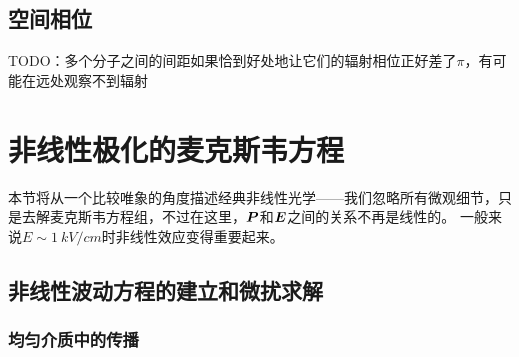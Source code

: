 \subsection{空间相位}

TODO：多个分子之间的间距如果恰到好处地让它们的辐射相位正好差了$\pi$，有可能在远处观察不到辐射

\section{非线性极化的麦克斯韦方程}\label{sec:non-linear-maxwell}

本节将从一个比较唯象的角度描述经典非线性光学——我们忽略所有微观细节，只是去解麦克斯韦方程组，不过在这里，$\vb*{P}$和$\vb*{E}$之间的关系不再是线性的。
一般来说$E \sim \SI{1}{kV/cm}$时非线性效应变得重要起来。

\subsection{非线性波动方程的建立和微扰求解}

\subsubsection{均匀介质中的传播}

